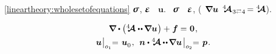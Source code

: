

\label{para:equationsindisplacements.linearelasticity}
 
~\eqref{lineartheory:wholesetofequations}
$\linearstress$, $\infinitesimaldeformation$ ~$\bm{u}$.
~$\linearstress$
~$\infinitesimaldeformation$,
(~${\hspace{-0.2ex} \bm{\nabla}\hspace{-0.2ex} \bm{u}}$
 ${%
\stiffnesstensor_{\hspace{.12ex} \indexjuggling{3}{4}} \hspace{-0.25ex} = \stiffnesstensor%
}$).

\nopagebreak\vspace{-0.1em}
\begin{equation}\label{lineartheory:equationsindisplacements}
\begin{array}{c}
\boldnabla \dotp \left( \stiffnesstensor \dotdotp \hspace{-0.12ex} \boldnabla \bm{u} \hspace{.1ex} \right) + \hspace{.1ex} \bm{f} = \hspace{.1ex} \bm{0}
\hspace{.16ex} , \\[.4em]
%
\bm{u} \hspace{.1ex} \bigr|_{o_1} \hspace{-0.64ex} = \hspace{.2ex} \bm{u}_{\raisemath{-0.1em}{0}}
\hspace{.16ex} , \:\:
\unitnormalvector \dotp %
\stiffnesstensor \hspace{-0.08ex} \dotdotp \hspace{-0.24ex} \boldnabla \bm{u}
\hspace{.25ex} \bigr|_{o_2} \hspace{-0.64ex} = \hspace{.2ex} \bm{p}
\hspace{.16ex} .
\end{array}
\end{equation}%

